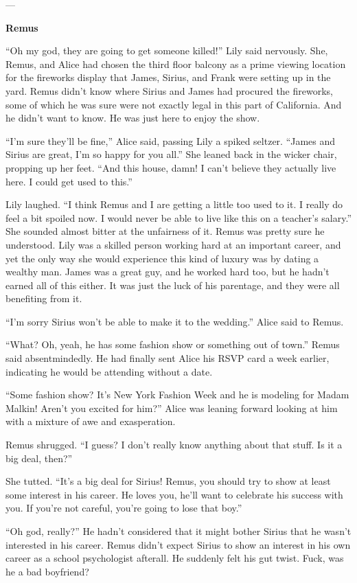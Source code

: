 \documentclass[12pt,twoside,openright]{memoir}
\begin{document}
---

\textbf{Remus} 

``Oh my god, they are going to get someone killed!'' Lily said nervously. She, Remus, and Alice had chosen the third floor balcony as a prime viewing location for the fireworks display that James, Sirius, and Frank were setting up in the yard. Remus didn't know where Sirius and James had procured the fireworks, some of which he was sure were not exactly legal in this part of California. And he didn't want to know. He was just here to enjoy the show. 

``I'm sure they'll be fine,'' Alice said, passing Lily a spiked seltzer. ``James and Sirius are great, I'm so happy for you all.'' She leaned back in the wicker chair, propping up her feet. ``And this house, damn! I can't believe they actually live here. I could get used to this.''

Lily laughed. ``I think Remus and I are getting a little too used to it. I really do feel a bit spoiled now. I would never be able to live like this on a teacher's salary.'' She sounded almost bitter at the unfairness of it. Remus was pretty sure he understood. Lily was a skilled person working hard at an important career, and yet the only way she would experience this kind of luxury was by dating a wealthy man. James was a great guy, and he worked hard too, but he hadn't earned all of this either. It was just the luck of his parentage, and they were all benefiting from it.

``I'm sorry Sirius won't be able to make it to the wedding.'' Alice said to Remus. 

``What? Oh, yeah, he has some fashion show or something out of town.'' Remus said absentmindedly. He had finally sent Alice his RSVP card a week earlier, indicating he would be attending without a date. 

``Some fashion show? It's New York Fashion Week and he is modeling for Madam Malkin! Aren't you excited for him?'' Alice was leaning forward looking at him with a mixture of awe and exasperation.

Remus shrugged. ``I guess? I don't really know anything about that stuff. Is it a big deal, then?''

She tutted. ``It's a big deal for Sirius! Remus, you should try to show at least some interest in his career. He loves you, he'll want to celebrate his success with you. If you're not careful, you're going to lose that boy.''

``Oh god, really?'' He hadn't considered that it might bother Sirius that he wasn't interested in his career. Remus didn't expect Sirius to show an interest in his own career as a school psychologist afterall. He suddenly felt his gut twist. Fuck, was he a bad boyfriend?
\end{document}
